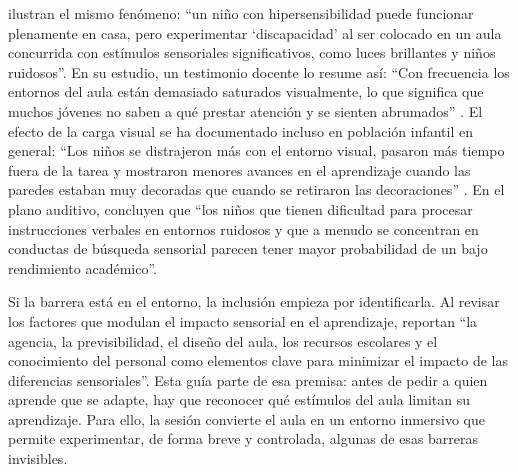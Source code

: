 \citet[p.~2]{jones2020} ilustran el mismo fenómeno: \enquote{un niño con hipersensibilidad puede funcionar plenamente en casa, pero experimentar \enquote{discapacidad} al ser colocado en un aula concurrida con estímulos sensoriales significativos, como luces brillantes y niños ruidosos}.
En su estudio, un testimonio docente lo resume así: \enquote{Con frecuencia los entornos del aula están demasiado saturados visualmente, lo que significa que muchos jóvenes no saben a qué prestar atención y se sienten abrumados} \citep[p.~6]{jones2020}.
El efecto de la carga visual se ha documentado incluso en población infantil en general: \enquote{Los niños se distrajeron más con el entorno visual, pasaron más tiempo fuera de la tarea y mostraron menores avances en el aprendizaje cuando las paredes estaban muy decoradas que cuando se retiraron las decoraciones} \citep[p.~1362]{fisher2014}.
En el plano auditivo, \citet[p.~564]{ashburner2008} concluyen que \enquote{los niños que tienen dificultad para procesar instrucciones verbales en entornos ruidosos y que a menudo se concentran en conductas de búsqueda sensorial parecen tener mayor probabilidad de un bajo rendimiento académico}.

Si la barrera está en el entorno, la inclusión empieza por identificarla. Al revisar los factores que modulan el impacto sensorial en el aprendizaje, \citet[p.~11]{jones2020} reportan \enquote{la agencia, la previsibilidad, el diseño del aula, los recursos escolares y el conocimiento del personal como elementos clave para minimizar el impacto de las diferencias sensoriales}.
Esta guía parte de esa premisa: antes de pedir a quien aprende que se adapte, hay que reconocer qué estímulos del aula limitan su aprendizaje. Para ello, la sesión convierte el aula en un entorno inmersivo que permite experimentar, de forma breve y controlada, algunas de esas barreras invisibles.
